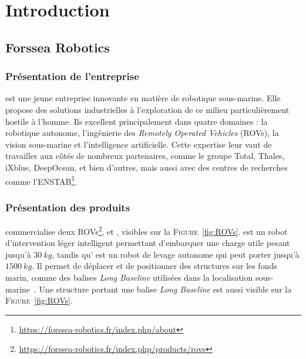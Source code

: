 \chapter{Introduction}
\label{chapter:introduction}
	
	\section{Forssea Robotics}

		\subsection{Présentation de l'entreprise}

			\forssea{} est une jeune entreprise innovante en matière de robotique sous-marine. Elle propose des solutions industrielles à l'exploration de ce milieu particulièrement hostile à l'homme. Ils excellent principalement dans quatre domaines : la robotique autonome, l'ingénierie des \textit{Remotely Operated Vehicles} (\gls{ROV}s), la vision sous-marine et l'intelligence artificielle. Cette expertise leur vaut de travailler aux côtés de nombreux partenaires, comme le groupe Total, Thales, iXblue, DeepOcean, et bien d'autres, mais aussi avec des centres de recherches comme l'\gls{ENSTAB}\footnote{\url{https://forssea-robotics.fr/index.php/about}}.

		\subsection{Présentation des produits}

			\forssea{} commercialise deux \gls{ROV}s\footnote{\url{https://forssea-robotics.fr/index.php/products/rovs}}, \argos{} et \atoll{}, visibles sur la \textsc{Figure}~\ref{fig:ROVs}. \argos{} est un robot d'intervention léger intelligent permettant d'embarquer une charge utile pesant jusqu'à $30\ kg$, tandis qu'\atoll{} est un robot de levage autonome qui peut porter jusqu'à $1500\ kg$. Il permet de déplacer et de positionner des structures sur les fonds marin, comme des balises \textit{Long Baseline} utilisées dans la localisation sous-marine~\cite{milne1983underwater}. Une structure portant une balise \textit{Long Baseline} est aussi visible sur la \textsc{Figure}~\ref{fig:ROVs}.

